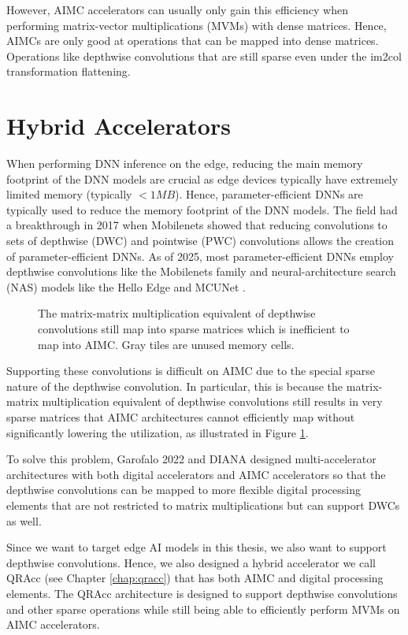 However, AIMC accelerators can usually only gain this efficiency when performing matrix-vector multiplications (MVMs) with dense matrices. Hence, AIMCs are only good at operations that can be mapped into dense matrices. Operations like depthwise convolutions \cite{howard2017mobilenets} that are still sparse even under the im2col transformation flattening. 

\section{Hybrid Accelerators}

When performing DNN inference on the edge, reducing the main memory footprint of the DNN models are crucial as edge devices typically have extremely limited memory (typically $<1MB$). Hence, parameter-efficient DNNs are typically used to reduce the memory footprint of the DNN models. The field had a breakthrough in 2017 when Mobilenets \cite{howard2017mobilenets,sandler2018mobilenetv2} showed that reducing convolutions to sets of depthwise (DWC) and pointwise (PWC) convolutions allows the creation of parameter-efficient DNNs. As of 2025, most parameter-efficient DNNs employ depthwise convolutions like the Mobilenets family and  neural-architecture search (NAS) models like the Hello Edge \cite{zhang2017hello} and MCUNet \cite{lin2020mcunet}.

\begin{figure}[h]
    \centering
    
    \caption{The matrix-matrix multiplication equivalent of depthwise convolutions still map into sparse matrices which is inefficient to map into AIMC. Gray tiles are unused memory cells.}
    \label{fig:depthwise_sparse_mapping}
\end{figure}

Supporting these convolutions is difficult on AIMC due to the special sparse nature of the depthwise convolution. In particular, this is because the matrix-matrix multiplication equivalent of depthwise convolutions still results in very sparse matrices that AIMC architectures cannot efficiently map without significantly lowering the utilization, as illustrated in Figure \ref{fig:depthwise_sparse_mapping}.

To solve this problem, Garofalo 2022 \cite{garofalo2022heterogeneous} and DIANA \cite{houshmand2022diana} designed multi-accelerator architectures with both digital accelerators and AIMC accelerators so that the depthwise convolutions can be mapped to more flexible digital processing elements that are not restricted to matrix multiplications but can support DWCs as well. 

Since we want to target edge AI models in this thesis, we also want to support depthwise convolutions. Hence, we also designed a hybrid accelerator we call QRAcc (see Chapter \ref{chap:qracc}) that has both AIMC and digital processing elements. The QRAcc architecture is designed to support depthwise convolutions and other sparse operations while still being able to efficiently perform MVMs on AIMC accelerators.